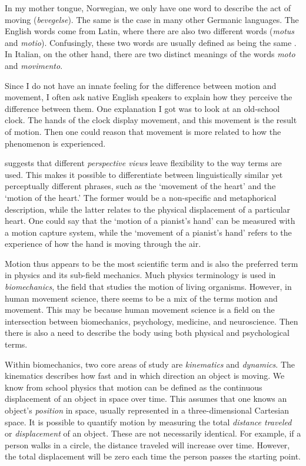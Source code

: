 In my mother tongue, Norwegian, we only have one word to describe the act of moving (\emph{bevegelse}). The same is the case in many other Germanic languages. The English words come from Latin, where there are also two different words (\emph{motus} and \emph{motio}). Confusingly, these two words are usually defined as being the same \citep{jacob_acousmatic_2019}. In Italian, on the other hand, there are two distinct meanings of the words \emph{moto} and \emph{movimento}.

Since I do not have an innate feeling for the difference between motion and movement, I often ask native English speakers to explain how they perceive the difference between them. One explanation I got was to look at an old-school clock. The hands of the clock display movement, and this movement is the result of motion. Then one could reason that movement is more related to how the phenomenon is experienced.

\citet{jacob_acousmatic_2019} suggests that different \emph{perspective views} leave flexibility to the way terms are used. This makes it possible to differentiate between linguistically similar yet perceptually different phrases, such as the `movement of the heart' and the `motion of the heart.' The former would be a non-specific and metaphorical description, while the latter relates to the physical displacement of a particular heart. One could say that the `motion of a pianist's hand' can be measured with a motion capture system, while the `movement of a pianist's hand' refers to the experience of how the hand is moving through the air.

Motion thus appears to be the most scientific term and is also the preferred term in physics and its sub-field mechanics. Much physics terminology is used in \emph{biomechanics}, the field that studies the motion of living organisms. However, in human movement science, there seems to be a mix of the terms motion and movement. This may be because human movement science is a field on the intersection between biomechanics, psychology, medicine, and neuroscience. Then there is also a need to describe the body using both physical and psychological terms.

Within biomechanics, two core areas of study are \emph{kinematics} and \emph{dynamics}. The kinematics describes how fast and in which direction an object is moving. We know from school physics that motion can be defined as the continuous displacement of an object in space over time. This assumes that one knows an object's \emph{position} in space, usually represented in a three-dimensional Cartesian space. It is possible to quantify motion by measuring the total \emph{distance traveled} or \emph{displacement} of an object. These are not necessarily identical. For example, if a person walks in a circle, the distance traveled will increase over time. However, the total displacement will be zero each time the person passes the starting point.


